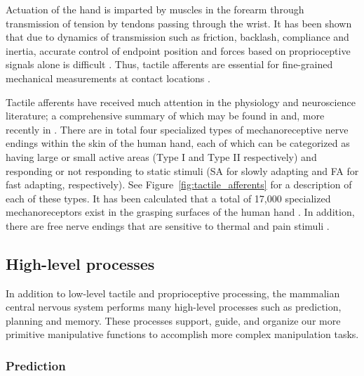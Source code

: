Actuation of the hand is imparted by muscles in the forearm through transmission of tension by tendons passing through the wrist.
It has been shown that due to dynamics of transmission such as friction, backlash, compliance and inertia, accurate control of endpoint position and forces based on proprioceptive signals alone is difficult \cite{kaneko1991new}.
Thus, tactile afferents are essential for fine-grained mechanical measurements at contact locations \cite{Johansson1984}.

Tactile afferents have received much attention in the physiology and neuroscience literature; a comprehensive summary of which may be found in \cite{vallbo1984properties} and, more recently in \cite{johansson2009coding}.
There are in total four specialized types of mechanoreceptive nerve endings within the skin of the human hand, each of which can be categorized as having large or small active areas (Type I and Type II respectively) and responding or not responding to static stimuli (SA for slowly adapting and FA for
fast adapting, respectively).
See Figure~\ref{fig:tactile_afferents} for a description of each of these types.
It has been calculated that a total of 17,000 specialized mechanoreceptors exist in the grasping surfaces of the human hand \cite{johansson2009coding}.
In addition, there are free nerve endings that are sensitive to thermal and pain stimuli \cite{howe1993tactile}.

\subsection{High-level processes}
\label{high_level_processes}

In addition to low-level tactile and proprioceptive processing, the mammalian central nervous system performs many high-level processes such as prediction, planning and memory.
These processes support, guide, and organize our more primitive manipulative functions to accomplish more complex manipulation tasks.

\subsubsection*{Prediction}

